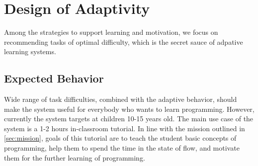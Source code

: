 \chapter{Design of Adaptivity}
\label{chap:design-of-adaptivity}


Among the strategies to support learning and motivation,
we focus on recommending tasks of optimal difficulty,
which is the secret sauce of adpative learning systems.


\section{Expected Behavior}  %
\label{sec:robomission.behavior}



Wide range of task difficulties, combined with the adaptive behavior,
should make the system useful for everybody who wants to learn programming.
However, %
currently the system targets at children 10-15 years old.
The main use case of the system is a 1-2 hours in-classroom tutorial.
In line with the mission outlined in \cref{sec:mission}, goals of this tutorial
are to teach the student basic concepts of programming,
help them to spend the time in the state of flow,
and motivate them for the further learning of programming. %

